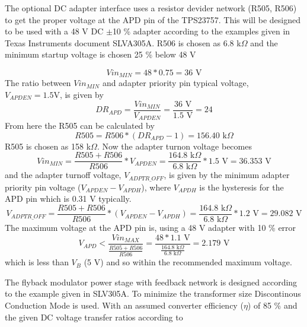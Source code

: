 The optional DC adapter interface uses a resistor devider network
(R505, R506) to get the proper voltage at the APD pin of the
TPS23757. This will be designed to be used with a 48 V DC $\pm$10 \%
adapter according to the examples given in Texas Instruments document
SLVA305A. R506 is chosen as 6.8 k$\Omega$ and the minimum startup
voltage is chosen 25 \% below 48 V

\begin{equation}
Vin_{MIN}=48 * 0.75 = 36 \text{ V}
\end{equation}
The ratio between $Vin_{MIN}$ and adapter priority pin typical voltage,
$V_{APDEN}=1.5\text{V}$, is given by
\begin{equation}
DR_{APD}=\frac{Vin_{MIN}}{V_{APDEN}}=\frac{36 \text{ V}}{1.5 \text{ V}}=24
\end{equation}
From here the R505 can be calculated by
\begin{equation}
R505 = R506 * (DR_{APD} - 1) = 156.40 \text{ k$\Omega$}
\end{equation}
R505 is chosen as 158 k$\Omega$. Now the adapter turnon voltage
becomes
\begin{equation}
Vin_{MIN}=\frac{R505+R506}{R506} * V_{APDEN}
= \frac{164.8 \text{ k$\Omega$}}{6.8 \text{ k$\Omega$}} * 1.5 \text{ V}
= 36.353 \text{ V}
\end{equation}
and the adapter turnoff voltage, $V_{ADPTR\_OFF}$, is given by the
minimum adapter priority pin voltage ($V_{APDEN} - V_{APDH}$), where
$V_{APDH}$ is the hysteresis for the APD pin which is 0.31 V
typically.
\begin{equation}
V_{ADPTR\_OFF}=\frac{R505+R506}{R506} * (V_{APDEN} - V_{APDH})
= \frac{164.8 \text{ k$\Omega$}}{6.8 \text{ k$\Omega$}} * 1.2 \text{ V} =
29.082 \text{ V}
\end{equation}
The maximum voltage at the APD pin is, using a 48 V adapter with 10 \% error
\begin{equation}
V_{APD} < \frac{Vin_{MAX}}{\frac{R505+R506}{R506}}
= \frac{48*1.1 \text{ V}}{\frac{164.8 \text{ k$\Omega$}}{6.8 \text{ k$\Omega$}}}
= 2.179 \text{ V}
\end{equation}
which is less than $V_B$ (5 V) and so within the recommended maximum
voltage.

The flyback modulator power stage with feedback network is designed
according to the example given in SLV305A.
To minimize the transformer size Discontinous Conduction Mode is
used. With an assumed converter efficiency ($\eta$) of 85 \% and the
given DC voltage transfer ratios according to

